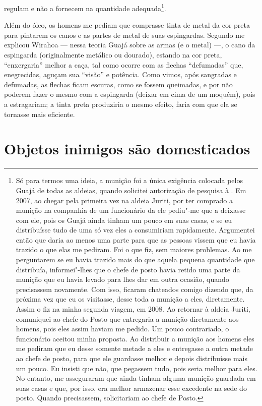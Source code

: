regulam e não a fornecem na quantidade adequada\footnote{Só para termos
  uma ideia, a munição foi a única exigência colocada pelos Guajá de
  todas as aldeias, quando solicitei autorização de pesquisa à . Em
  2007, ao chegar pela primeira vez na aldeia Juriti, por ter comprado a
  munição na companhia de um funcionário da  ele pediu"-me que a
  deixasse com ele, pois os Guajá ainda tinham um pouco em suas casas, e
  se eu distribuísse tudo de uma só vez eles a consumiriam rapidamente.
  Argumentei então que daria ao menos uma parte para que as pessoas
  vissem que eu havia trazido o que elas me pediram. Foi o que fiz, sem
  maiores problemas. Ao me perguntarem se eu havia trazido mais do que
  aquela pequena quantidade que distribuía, informei"-lhes que o chefe de
  posto havia retido uma parte da munição que eu havia levado para lhes
  dar em outra ocasião, quando precisassem novamente. Com isso, ficaram
  chateados comigo dizendo que, da próxima vez que eu os visitasse,
  desse toda a munição a eles, diretamente. Assim o fiz na minha segunda
  viagem, em 2008. Ao retornar à aldeia Juriti, comuniquei ao chefe do
  Posto que entregaria a munição diretamente aos homens, pois eles assim
  haviam me pedido. Um pouco contrariado, o funcionário aceitou minha
  proposta. Ao distribuir a munição aos homens eles me pediram que eu
  desse somente metade a eles e entregasse a outra metade ao chefe de
  posto, para que ele guardasse melhor e depois distribuísse mais um
  pouco. Eu insisti que não, que pegassem tudo, pois seria melhor para
  eles. No entanto, me asseguraram que ainda tinham alguma munição
  guardada em suas casas e que, por isso, era melhor armazenar esse
  excedente na sede do posto. Quando precisassem, solicitariam ao chefe
  de Posto.}.

Além do óleo, os homens me pediam que comprasse tinta de metal da cor
preta para pintarem os canos e as partes de metal de suas espingardas.
Segundo me explicou Wirahoa --- nessa teoria Guajá sobre as armas (e o
metal) ---, o cano da espingarda (originalmente metálico ou dourado),
estando na cor preta, ``enxergaria'' melhor a caça, tal como ocorre com as
flechas ``defumadas'' que, enegrecidas, aguçam sua ``visão'' e potência.
Como vimos, após sangradas e defumadas, as flechas ficam escuras, como
se fossem queimadas, e por não poderem fazer o mesmo com a espingarda
(deixar em cima de um moquém), pois a estragariam; a tinta preta
produziria o mesmo efeito, faria com que ela se tornasse mais eficiente.

\section{Objetos inimigos são domesticados}

